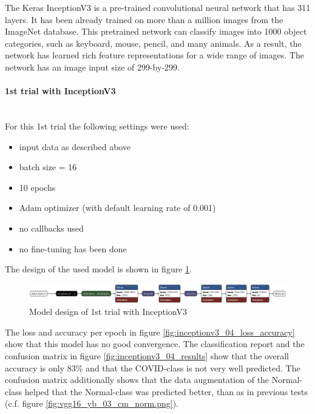 \documentclass{article}
\begin{document}
The Keras InceptionV3 is a pre-trained convolutional neural network that has 311 layers. It has been already trained on more than a million images from the ImageNet database. This pretrained network can classify images into 1000 object categories, such as keyboard, mouse, pencil, and many animals. As a result, the network has learned rich feature representations for a wide range of images. The network has an image input size of 299-by-299. 

\paragraph{1st trial with InceptionV3}\mbox{}\\
For this 1st trial the following settings were used: 
\begin{itemize}
\item input data as described above
\item batch size = 16
\item 10 epochs 
\item Adam optimizer (with default learning rate of 0.001)
\item no callbacks used
\item no fine-tuning has been done
\end{itemize}

The design of the used model is shown in figure \ref{fig:inceptionv3_04.keras_model_design}.
\begin{figure}[ht] %
    \centering
    \includegraphics[width=1.0\linewidth]{inceptionv3_04.keras_model_design_nice.png}
    \caption{Model design of 1st trial with InceptionV3}
    \label{fig:inceptionv3_04.keras_model_design}
\end{figure}

The loss and accuracy per epoch in figure \ref{fig:inceptionv3_04_loss_accuracy} show that this model has no good convergence. The classification report and the confusion matrix in figure \ref{fig:inceptionv3_04_results} show that the overall accuracy is only 83\% and that the COVID-class is not very well predicted. The confusion matrix additionally shows that the data augmentation of the Normal-class helped that the Normal-class was predicted better, than as in previous tests (c.f. figure \ref{fig:vgg16_yb_03_cm_norm.png}).
\end{document}
